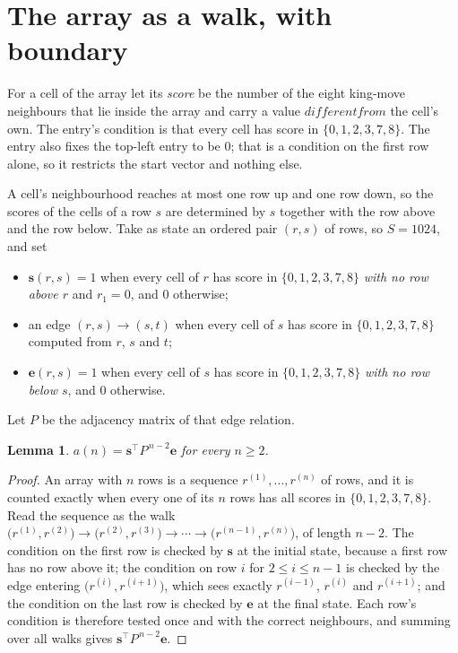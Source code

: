 \documentclass[11pt,a4paper]{article}
\theoremstyle{plain}
\newtheorem{lemma}[theorem]{Lemma}
\theoremstyle{definition}
\begin{document}
\section{The array as a walk, with boundary}

For a cell of the array let its \emph{score} be the number of the eight king-move neighbours that lie inside
the array and carry a value $different from$ the cell's own. The entry's condition is that every cell
has score in $\{0,1,2,3,7,8\}$. The entry also fixes the top-left entry to be $0$; that is a condition on the first row alone, so it restricts the start vector and nothing else.

A cell's neighbourhood reaches at most one row up and one row down, so the scores of the
cells of a row $s$ are determined by $s$ together with the row above and the row below.
Take as state an ordered pair $(r,s)$ of rows, so $S=1024$, and set
\begin{itemize}
\item $\mathbf{s}(r,s)=1$ when every cell of $r$ has score in $\{0,1,2,3,7,8\}$ \emph{with no row
above $r$} and $r_1=0$, and $0$ otherwise;
\item an edge $(r,s)\to(s,t)$ when every cell of $s$ has score in $\{0,1,2,3,7,8\}$ computed from
$r$, $s$ and $t$;
\item $\mathbf{e}(r,s)=1$ when every cell of $s$ has score in $\{0,1,2,3,7,8\}$ \emph{with no row
below $s$}, and $0$ otherwise.
\end{itemize}
Let $P$ be the adjacency matrix of that edge relation.

\begin{lemma}\label{lem:walk}
$a(n)=\mathbf{s}^{\!\top}P^{\,n-2}\mathbf{e}$ for every $n\ge2$.
\end{lemma}

\begin{proof}
An array with $n$ rows is a sequence $r^{(1)},\dots,r^{(n)}$ of rows, and it is counted
exactly when every one of its $n$ rows has all scores in $\{0,1,2,3,7,8\}$. Read the sequence as the
walk $\bigl(r^{(1)},r^{(2)}\bigr)\to\bigl(r^{(2)},r^{(3)}\bigr)\to\cdots\to
\bigl(r^{(n-1)},r^{(n)}\bigr)$, of length $n-2$. The condition on the first row is
checked by $\mathbf{s}$ at the initial state, because a first row has no row above it; the
condition on row $i$ for $2\le i\le n-1$ is checked by the edge entering
$\bigl(r^{(i)},r^{(i+1)}\bigr)$, which sees exactly $r^{(i-1)}$, $r^{(i)}$ and
$r^{(i+1)}$; and the condition on the last row is checked by $\mathbf{e}$ at the final
state. Each row's condition is therefore tested once and with the correct neighbours, and
summing over all walks gives $\mathbf{s}^{\!\top}P^{\,n-2}\mathbf{e}$.
\end{proof}
\end{document}
